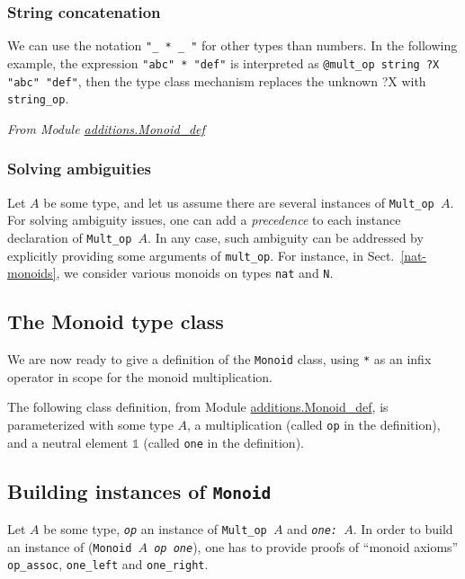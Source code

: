 \subsubsection{String concatenation}
We can use the notation \texttt{"\_ * \_ "} for other types than numbers.
In the following example,  the expression \texttt{"abc" * "def"} is interpreted
as \linebreak \texttt{@mult\_op string  {\color{darkred}?X} "abc"  "def"}, then the type  class mechanism replaces the unknown  {\color{darkred}?X} with 
\texttt{string\_op}.


\emph{From Module \href{../theories/html/additions.Monoid_def.html}{additions.Monoid\_def}}



\subsubsection{Solving ambiguities}
Let $A$ be some type, and let us assume there are several instances of
\texttt{Mult\_op $A$}. For solving ambiguity issues, one can
add a \emph{precedence} to each instance declaration of  
\texttt{Mult\_op $A$}. In any case, such ambiguity  can be addressed
by explicitly providing  some arguments of \texttt{mult\_op}.
For instance, in Sect.~\vref{nat-monoids}, we consider various monoids on types
\texttt{nat} and \texttt{N}. 


\subsection{The Monoid type class}
We are now ready to  give a definition of the \texttt{Monoid} class, using
\texttt{*} as an infix operator in scope  for the monoid  multiplication.

The following class definition, from Module \href{../theories/html/additions.Monoid_def.html}{additions.Monoid\_def},
is parameterized with some type $A$,
a multiplication (called \texttt{op} in the definition), and a neutral element
$\mathds{1}$ (called \texttt{one} in the definition).

\label{sect:monoid-def}




\subsection{Building instances of \texttt{Monoid}}
Let \texttt{$A$} be some type, \texttt{{\it op}} an instance of 
\texttt{Mult\_op $A$} and \texttt{\it one: $A$}.
In order to build an instance of (\texttt{Monoid $A$ {\it op} {\it one}}),
one has to provide proofs of ``monoid axioms'' \texttt{ op\_assoc},
\texttt{one\_left} and \texttt{one\_right}.

